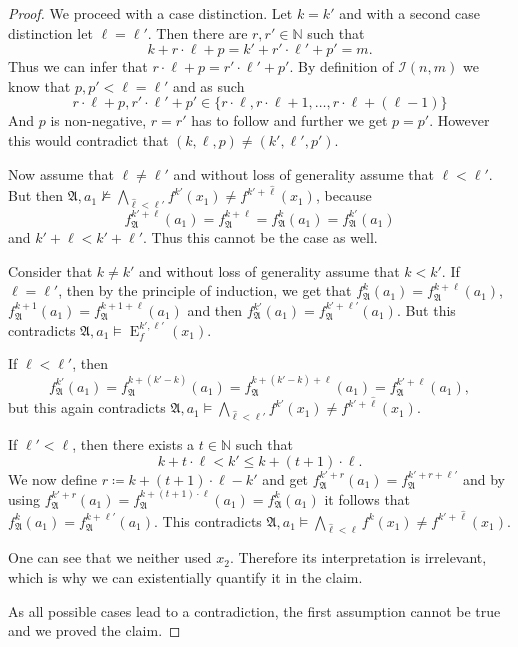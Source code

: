 \documentclass[a4paper,11pt,DIV=15]{scrartcl} %
\theoremstyle{plain}
\theoremstyle{definition}
\begin{document}
\begin{proof}
	We proceed with a case distinction. 
	Let $k=k'$ and with a second case distinction let $\ell=\ell'$.
	Then there are $r,r'\in\mathbb N$ such that
	$$k+r\cdot \ell + p = k'+r'\cdot \ell' + p'=m.$$
	Thus we can infer that $r\cdot \ell+p = r'\cdot \ell'+p'$.
	By definition of $\mathcal{I}(n,m)$ we know that $p,p'<\ell=\ell'$ and as such 
	$$r\cdot \ell +p,r'\cdot \ell'+p'\in \{r\cdot \ell,r\cdot \ell +1,\dots, r\cdot \ell +(\ell-1)\}$$
	And $p$ is non-negative, $r=r'$ has to follow and further we get $p=p'$.
	However this would contradict that $(k,\ell,p)\neq (k',\ell',p')$.
	
	Now assume that $\ell\neq\ell'$ and without loss of generality assume that $\ell<\ell'$.
	But then $\mathfrak A,a_1 \not\models \bigwedge_{\hat{\ell}<\ell'}f^{k'}(x_1)\neq f^{k'+\hat{\ell}}(x_1)$, because 
	$$f^{k'+\ell}_{\mathfrak A}(a_1)=f^{k+\ell}_{\mathfrak A}=f^k_{\mathfrak A}(a_1)=f^{k'}_{\mathfrak A}(a_1)$$
	and $k'+\ell < k'+\ell'$.
	Thus this cannot be the case as well.
	
	Consider that $k\neq k'$ and without loss of generality assume that $k<k'$.
	If $\ell=\ell'$, then by the principle of induction, we get that $f_{\mathfrak A}^k(a_1)=f_{\mathfrak A}^{k+\ell}(a_1)$, $f_{\mathfrak A}^{k+1}(a_1)=f_{\mathfrak A}^{k+1+\ell}(a_1)$ and then $f_{\mathfrak A}^{k'}(a_1)=f_{\mathfrak A}^{k'+\ell'}(a_1)$.
	But this contradicts $\mathfrak A,a_1 \models \operatorname{E}^{k',\ell'}_f(x_1)$.
	
	If $\ell < \ell'$, then 
	$$f_{\mathfrak A}^{k'}(a_1) =f_{\mathfrak A}^{k+(k'-k)}(a_1)=f_{\mathfrak A}^{k+(k'-k)+\ell}(a_1) = f_{\mathfrak A}^{k'+\ell}(a_1),$$
	but this again contradicts $\mathfrak A,a_1 \models \bigwedge_{\hat{\ell}<\ell'}f^{k'}(x_1)\neq f^{k'+\hat{\ell}}(x_1)$.
	
	If $\ell'<\ell$, then there exists a $t\in\mathbb N$ such that 
	$$k+t\cdot  \ell < k' \leq k+(t+1)\cdot \ell.$$
	We now define $r\coloneqq k+(t+1)\cdot \ell -k'$ and get $f_{\mathfrak A}^{k'+r}(a_1)=f_{\mathfrak A}^{k'+r+\ell'}$ and by using $f_{\mathfrak A}^{k'+r}(a_1)=f_{\mathfrak A}^{k+(t+1)\cdot \ell}(a_1)=f_{\mathfrak A}^k(a_1)$ it follows that $f_{\mathfrak A}^{k}(a_1)=f_{\mathfrak A}^{k+\ell'}(a_1)$.
	This contradicts $\mathfrak A,a_1 \models \bigwedge_{\hat{\ell}<\ell}f^{k}(x_1)\neq f^{k'+\hat{\ell}}(x_1)$.
	
	One can see that we neither used $x_2$.
	Therefore its interpretation is irrelevant, which is why we can existentially quantify it in the claim.
	
	As all possible cases lead to a contradiction, the first assumption cannot be true and we proved the claim.
\end{proof}
\end{document}
